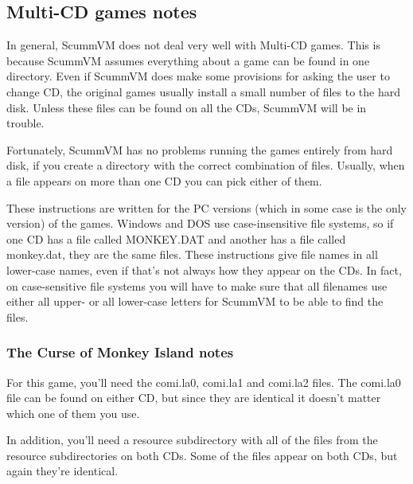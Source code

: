 


\subsection{Multi-CD games notes}
In general, ScummVM does not deal very well with Multi-CD games. This is
because ScummVM assumes everything about a game can be found in one directory.
Even if ScummVM does make some provisions for asking the user to change CD, the
original games usually install a small number of files to the hard disk. Unless
these files can be found on all the CDs, ScummVM will be in trouble.

Fortunately, ScummVM has no problems running the games entirely from hard disk,
if you create a directory with the correct combination of files. Usually, when
a file appears on more than one CD you can pick either of them.

These instructions are written for the PC versions (which in some case is the
only version) of the games. Windows and DOS use case-insensitive file systems,
so if one CD has a file called MONKEY.DAT and another has a file called
monkey.dat, they are the same files. These instructions give file names in all
lower-case names, even if that's not always how they appear on the CDs. In
fact, on case-sensitive file systems you will have to make sure that all
filenames use either all upper- or all lower-case letters for ScummVM to be
able to find the files.

\subsubsection{The Curse of Monkey Island notes}
For this game, you'll need the comi.la0, comi.la1 and comi.la2 files. The
comi.la0 file can be found on either CD, but since they are identical it
doesn't matter which one of them you use.

In addition, you'll need a resource subdirectory with all of the files from the
resource subdirectories on both CDs. Some of the files appear on both CDs, but
again they're identical.
